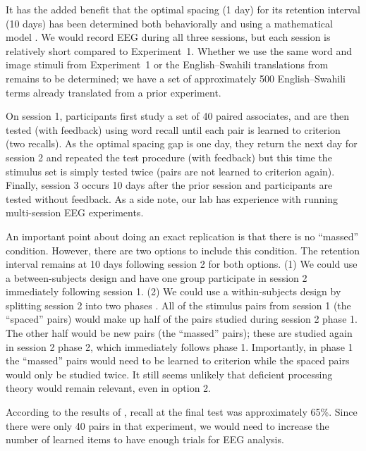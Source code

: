 It has the added benefit that the optimal spacing (1 day) for its retention interval (10 days) has been determined both behaviorally \cite{CepeEtal2009} and using a mathematical model \cite{MozeEtal2009}.  We would record EEG during all three sessions, but each session is relatively short compared to Experiment~1.  Whether we use the same word and image stimuli from Experiment~1 or the English--Swahili translations from  remains to be determined; we have a set of approximately 500 English--Swahili terms already translated from a prior experiment.

On session 1, participants first study a set of 40 paired associates, and are then tested (with feedback) using word recall until each pair is learned to criterion (two recalls).  As the optimal spacing gap is one day, they return the next day for session 2 and repeated the test procedure (with feedback) but this time the stimulus set is simply tested twice (pairs are not learned to criterion again).  Finally, session 3 occurs 10 days after the prior session and participants are tested without feedback.
As a side note, our lab has experience with running multi-session EEG experiments.

An important point about doing an exact replication is that there is no ``massed'' condition.  However, there are two options to include this condition.  The retention interval remains at 10 days following session 2 for both options.  (1) We could use a between-subjects design and have one group participate in session 2 immediately following session 1.  (2) We could use a within-subjects design by splitting session 2 into two phases \cite<similar to the design of>{WagnEtal2000}.  All of the stimulus pairs from session 1 (the ``spaced'' pairs) would make up half of the pairs studied during session 2 phase 1.  The other half would be new pairs (the ``massed'' pairs); these are studied again in session 2 phase 2, which immediately follows phase 1.  Importantly, in phase 1 the ``massed'' pairs would need to be learned to criterion while the spaced pairs would only be studied twice.
It still seems unlikely that deficient processing theory would remain relevant, even in option 2.

According to the results of , recall at the final test was approximately 65\%.  Since there were only 40 pairs in that experiment, we would need to increase the number of learned items to have enough trials for EEG analysis.

